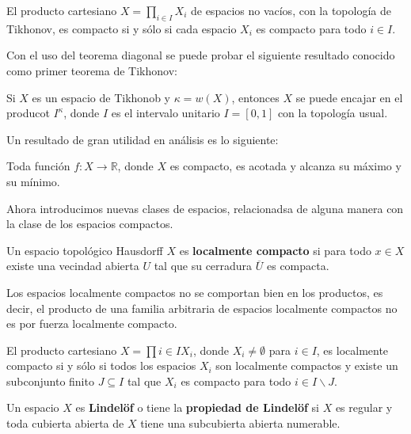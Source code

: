 \documentclass[12pt]{report}
\theoremstyle{largebreak}
\newcommand{\cf}[3]{\ensuremath{#1:#2\rightarrow#3}}
\begin{document}
    \begin{theor}
        El producto cartesiano $X=\prod_{i\in I}X_i$ de espacios no vacíos, con la topología de Tikhonov, es compacto si y sólo si cada espacio $X_i$ es compacto para todo $i\in I$.
    \end{theor}

    Con el uso del teorema diagonal se puede probar el siguiente resultado conocido como primer teorema de Tikhonov:

    \begin{theor}
        Si $X$ es un espacio de Tikhonob y $\kappa=w(X)$, entonces $X$ se puede encajar en el producot $I^\kappa$, donde $I$ es el intervalo unitario $I=[0,1]$ con la topología usual.
    \end{theor}

    Un resultado de gran utilidad en análisis es lo siguiente:

    \begin{theor}
        Toda función $\cf{f}{X}{\mathbb{R}}$, donde $X$ es compacto, es acotada y alcanza su máximo y su mínimo.
    \end{theor}

    Ahora introducimos nuevas clases de espacios, relacionadsa de alguna manera con la clase de los espacios compactos.

    \begin{mydef}
        Un espacio topológico Hausdorff $X$ es \textbf{localmente compacto} si para todo $x\in X$ existe una vecindad abierta $U$ tal que su cerradura $\overline{U}$ es compacta.
    \end{mydef}

    Los espacios localmente compactos no se comportan bien en los productos, es decir, el producto de una familia arbitraria de espacios localmente compactos no es por fuerza localmente compacto.

    \begin{theor}
        El producto cartesiano $X=\prod{i\in I}X_i$, donde $X_i\neq\emptyset$ para $i\in I$, es localmente compacto si y sólo si todos los espacios $X_i$ son localmente compactos y existe un subconjunto finito $J\subseteq I$ tal que $X_i$ es compacto para todo $i\in I\backslash J$.
    \end{theor} 

    \begin{mydef}
        Un espacio $X$ es \textbf{Lindelöf} o tiene la \textbf{propiedad de Lindelöf} si $X$ es regular y toda cubierta abierta de $X$ tiene una subcubierta abierta numerable.
    \end{mydef}
\end{document}
